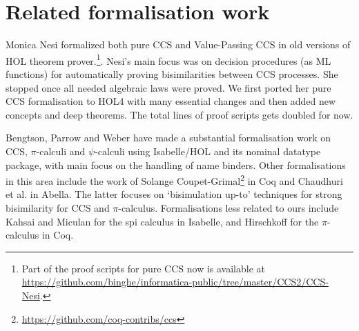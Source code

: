 \section{Related formalisation work}

Monica Nesi formalized both pure CCS \cite{Nesi:1992ve} and Value-Passing CCS
\cite{Nesi:2017wo} in old versions of HOL theorem prover.\footnote{Part of
 the proof scripts for pure CCS now is available at \url{https://github.com/binghe/informatica-public/tree/master/CCS2/CCS-Nesi}.}.
Nesi's main focus was on
 decision procedures (as ML functions) for
automatically proving bisimilarities between CCS
processes. She stopped once all needed algebraic laws were proved. We
first ported her pure CCS formalisation to HOL4 with many essential
changes and then added new concepts and deep theorems. The total lines of
proof scripts gets doubled for now.

Bengtson,  Parrow and Weber
have made a substantial formalisation work 
on CCS, $\pi$-calculi
\cite{bengtson2010formalising,bengtson2007formalising,bengtson2007completeness}
and $\psi$-calculi 
using Isabelle/HOL and its nominal datatype package, with main focus on the handling of name binders.
%
Other formalisations in this area include the work of Solange
Coupet-Grimal\footnote{\url{https://github.com/coq-contribs/ccs}} in Coq
and Chaudhuri et al.\;\cite{chaudhuri2015lightweight} in Abella. The
latter focuses on `bisimulation up-to' techniques for strong bisimilarity 
for CCS and $\pi$-calculus.
Formalisations less related to ours
include Kahsai and Miculan \cite{kahsai2008implementing} for the spi
calculus  in Isabelle, and Hirschkoff \cite{hirschkoff1997full} for the $\pi$-calculus in Coq.

